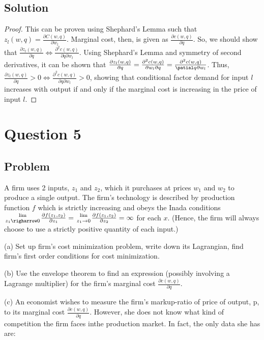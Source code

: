 \documentclass[10pt, a4paper]{article}
\begin{document}
    \subsection*{Solution}
      \begin{proof}
        This can be proven using Shephard's Lemma such that $z_l(w,q) = \frac{\partial C(w,q)}{\partial w_l}$. Marginal cost, then, is given as $\frac{\partial c(w,q)}{\partial q}$. So, we should show that $\frac{\partial z_l (w,q)}{\partial q}\Leftrightarrow \frac{\partial^2c(w,q)}{\partial q\partial w_l}$. Using Shephard's Lemma and symmetry of second derivatives, it can be shown that $\frac{\partial z_l(w,q)}{\partial q} = \frac{\partial^2 c(w,q)}{\partial w_l\partial q}=\frac{\partial^2 c(w,q)}{\patial q\partial w_l}$. Thus, $\frac{\partial z_l(w,q)}{\partial q}>0\Leftrightarrow \frac{\partial^2c(w,q)}{\partial q\partial w_l}>0$, showing that conditional factor demand for input $l$ increases with output if and only if the marginal cost is increasing in the price of input $l$.
      \end{proof}
  \section{Question 5}
    \subsection*{Problem}
      A firm uses 2 inputs, $z_1$ and $z_2$, which it purchases at prices $w_1$ and $w_2$ to produce a single output. The firm's technology is described by production function $f$ which is strictly increasing and obeys the Inada conditions ${\lim\atop{z_1\righarrow0}}\frac{\partial f(z_1,z_2)}{\partial z_1}={\lim\atop{z_1\rightarrow0}}\frac{\partial f(z_1, z_2)}{\partial z_2}=\infty$ for each $x$. (Hence, the firm will always choose to use a strictly positive quantity of each input.)

      (a) Set up firm's cost minimization problem, write down its Lagrangian, find firm's first order conditions for cost minimization.

      (b) Use the envelope theorem to find an expression (possibly involving a Lagrange multiplier) for the firm's marginal cost $\frac{\partial c(w,q)}{\partial q}$.

      (c) An economist wishes to measure the firm's markup-ratio of price of output, p, to its marginal cost $\frac{\partial c(w,q)}{\partial q}$. However, she does not know what kind of competition the firm faces inthe production market. In fact, the only data she has are:
        
\end{document}

